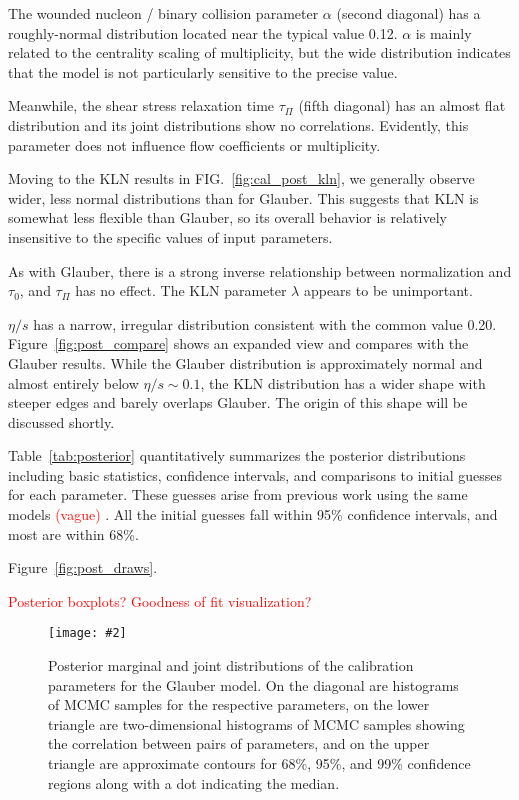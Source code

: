 \documentclass[aps,prc,reprint,superscriptaddress,amsmath]{revtex4-1}
\newcommand{\todo}[1]{\textcolor{red}{#1}}
\newcommand{\widefig}[3][t]{
  \begin{figure*}[#1]
    \texttt{[image: \#2]}
    \caption{\label{fig:#2}#3}
  \end{figure*}
}
\begin{document}
The wounded nucleon / binary collision parameter $\alpha$ (second diagonal) has a roughly-normal distribution located near the typical value 0.12.
$\alpha$ is mainly related to the centrality scaling of multiplicity, but the wide distribution indicates that the model is not particularly sensitive to the precise value.

Meanwhile, the shear stress relaxation time $\tau_\Pi$ (fifth diagonal) has an almost flat distribution and its joint distributions show no correlations.
Evidently, this parameter does not influence flow coefficients or multiplicity.

Moving to the KLN results in FIG.~\ref{fig:cal_post_kln}, we generally observe wider, less normal distributions than for Glauber.
This suggests that KLN is somewhat less flexible than Glauber, so its overall behavior is relatively insensitive to the specific values of input parameters.

As with Glauber, there is a strong inverse relationship between normalization and $\tau_0$, and $\tau_\Pi$ has no effect.
The KLN parameter $\lambda$ appears to be unimportant.

$\eta/s$ has a narrow, irregular distribution consistent with the common value 0.20.
Figure~\ref{fig:post_compare} shows an expanded view and compares with the Glauber results.
While the Glauber distribution is approximately normal and almost entirely below $\eta/s \sim 0.1$, the KLN distribution has a wider shape with steeper edges and barely overlaps Glauber.
The origin of this shape will be discussed shortly.

Table~\ref{tab:posterior} quantitatively summarizes the posterior distributions including basic statistics, confidence intervals, and comparisons to initial guesses for each parameter.
These guesses arise from previous work using the same models \todo{(vague)} \cite{Shen:2011zc,Heinz:2011kt}.
All the initial guesses fall within 95\% confidence intervals, and most are within 68\%.

Figure~\ref{fig:post_draws}.

\todo{
  Posterior boxplots?
  Goodness of fit visualization?
}

\widefig{cal_post_glb}{
  Posterior marginal and joint distributions of the calibration parameters for the Glauber model.
  On the diagonal are histograms of MCMC samples for the respective parameters,
  on the lower triangle are two-dimensional histograms of MCMC samples showing the correlation between pairs of parameters,
  and on the upper triangle are approximate contours for 68\%, 95\%, and 99\% confidence regions along with a dot indicating the median.
}
\end{document}
